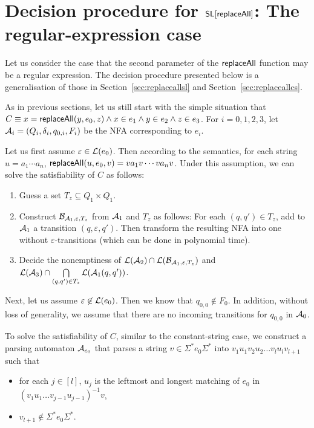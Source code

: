 
\section{Decision procedure for $\mathsf{SL}[\mathsf{replaceAll}]$: The regular-expression case} \label{sec:replaceallre}

Let us consider the case that the second parameter of the $\mathsf{replaceAll}$ function may be a regular expression.  The decision procedure presented below is a generalisation of those in Section~\ref{sec:replaceallsl} and Section~\ref{sec:replaceallcs}. 

As in previous sections, let us still start with the simple situation that $C \equiv x = \mathsf{replaceAll}(y, e_0, z) \wedge x \in e_1 \wedge y \in e_2 \wedge z \in e_3$. For $i=0,1,2,3$, let $\mathcal{A}_i = (Q_i, \delta_i, q_{0,i}, F_i)$ be the NFA corresponding to $e_i$. 

Let us first assume $\varepsilon \in \mathcal{L}(e_0)$. Then according to the semantics, for each string $u = a_1 \cdots a_n$, $\mathsf{replaceAll}(u, e_0, v) = v a_1 v \cdots v a_n v$. Under this assumption, we can solve the satisfiability of $C$ as follows: 
\begin{enumerate}
\item Guess a set $T_z \subseteq Q_1 \times Q_1$. 
%
\item Construct $\mathcal{B}_{\mathcal{A}_1, \varepsilon, T_z}$ from $\mathcal{A}_1$ and $T_z$ as follows: For each $(q,q') \in T_z$, add to $\mathcal{A}_1$ a transition $(q, \varepsilon, q')$. Then transform the resulting NFA into one without $\varepsilon$-transitions (which can be done in polynomial time).
%
\item  Decide the nonemptiness of $\mathcal{L}(\mathcal{A}_2) \cap \mathcal{L}(\mathcal{B}_{\mathcal{A}_1, \varepsilon, T_z})$ and $\mathcal{L}(\mathcal{A}_3) \cap \bigcap \limits_{(q,q') \in T_z} \mathcal{L}(\mathcal{A}_1(q,q'))$.
\end{enumerate}

Next, let us assume $\varepsilon \not \in \mathcal{L}(e_0)$. Then we know that $q_{0,0} \not \in F_0$. In addition, without loss of generality, we assume that there are no incoming transitions for $q_{0,0}$ in $\mathcal{A}_0$.

To solve the satisfiability of $C$, similar to the constant-string case, we construct a parsing automaton $\mathcal{A}_{e_0}$ that parses a string $v \in \Sigma^\ast e_0 \Sigma^\ast$ into $v_1 u_1 v_2 u_2 \dots v_l u_l v_{l+1}$ such that 
\begin{itemize}
	\item for each $j \in [l]$, $u_j$ is the leftmost and longest matching of $e_0$ in $(v_1 u_1 \dots v_{j-1} u_{j-1})^{-1} v$,
	\item $v_{l+1} \not \in \Sigma^\ast e_0 \Sigma^\ast$.
\end{itemize}


